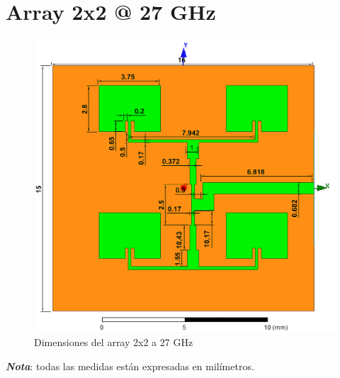 \section{Array 2x2 @ 27 GHz}
\vfill
\begin{figure}[H]
   	 \centering
        \includegraphics[width=\textwidth ,height=\textheight, keepaspectratio=true]{archivos/desarrollo/autocad/14v1}
        \caption{Dimensiones del array 2x2 a 27 GHz}
        \label{fig:2x23}
\end{figure}
\vfill
\textit{\textbf{Nota}}: todas las medidas están expresadas en milímetros.